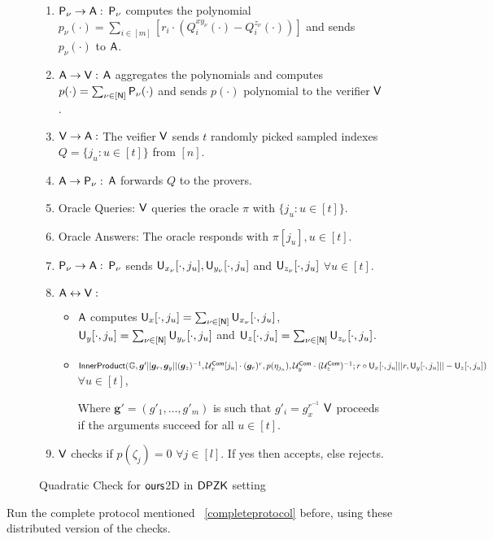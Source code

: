 \begin{figure}[h!]
\begin{framed}
\begin{enumerate}
			\item $\mathsf{P}_{\nu} \rightarrow \mathsf{A} : $ $\mathsf{P}_{\nu}$ computes the polynomial $p_{\nu}(\cdot) = \sum_{i\in [m]} [r_i \cdot (Q^{{xy}_{\nu}}_i(\cdot)  - Q^{z_{\nu}}_i(\cdot))]$ and sends $p_{\nu}(\cdot)$ to $\mathsf{A}$.
	
			\item $\mathsf{A} \rightarrow \mathsf{V} : $ $\mathsf{A}$ aggregates the polynomials and computes $p(\cdot) = \sum_{\nu \in [\mathsf{N}]} \mathsf{P}_{\nu}(\cdot)$ and sends $p(\cdot)$ polynomial to the verifier $\mathsf{V}$.
			
			\item $\mathsf{V} \rightarrow \mathsf{A} : $ The veifier $\mathsf{V}$ sends $t$ randomly picked sampled indexes $Q= \{j_u: u\in[t]\}$ from $[n]$. 
			
			\item $\mathsf{A} \rightarrow \mathsf{P}_{\nu} : $ $\mathsf{A}$ forwards $Q$ to the provers.
			
			\item Oracle Queries: $\mathsf{V}$ queries the oracle $\pi$ with $\{j_u:u\in[t]\}$.
			
			\item Oracle Answers: The oracle responds with $\pi[j_u], u\in[t]$.
	
			\item $\mathsf{P}_{\nu} \rightarrow \mathsf{A} : $ $\mathsf{P}_{\nu}$ sends $\mathsf{U}_{x_{\nu}}[\cdot, j_u], \mathsf{U}_{y_{\nu}}[\cdot, j_u]$ and $\mathsf{U}_{z_{\nu}}[\cdot,j_u]$ $\forall u\in[t]$.
	
			\item $\mathsf{A} \leftrightarrow \mathsf{V} : $ 
			\begin{itemize} 
				\item $\mathsf{A}$ computes $\mathsf{U}_{x}[\cdot, j_u] = \sum_{\nu \in [\mathsf{N}]} \mathsf{U}_{x_{\nu}}[\cdot, j_u]$, $\mathsf{U}_{y}[\cdot, j_u] = \sum_{\nu \in [\mathsf{N}]} \mathsf{U}_{y_{\nu}}[\cdot, j_u]$ and $\mathsf{U}_{z}[\cdot, j_u] = \sum_{\nu \in [\mathsf{N}]} \mathsf{U}_{z_{\nu}}[\cdot, j_u]$.
				
				\item $\mathsf{InnerProduct}(\mathbb{G},\bm{g}'||\bm{g}_r, \bm{g}_y||(\bm{g}_z)^{-1}, \mathcal{U}^{\mathsf{Com}}_x[j_u]\cdot (\bm{g}_r)^r, p(\eta_{j_u}), \mathcal{U}^{\mathsf{Com}}_y\cdot (\mathcal{U}^{\mathsf{Com}}_z)^{-1}; r\circ\mathsf{U}_x[\cdot,j_u]||r, \mathsf{U}_y[\cdot,j_u]||-\mathsf{U}_z[\cdot,j_u])$ $\forall u\in [t]$,
				
				Where $\bm{g}'= (g'_1, \ldots, g'_m)$ is such that $g'_i = g_x^{r^{-1}}$ 
				$\mathsf{V}$ proceeds if the arguments succeed for all $u \in [t]$.
			\end{itemize} 
	
			\item $\mathsf{V}$ checks if $p(\zeta_j) = 0$ $\forall j \in [l]$. If yes then accepts, else rejects.
		\end{enumerate}
	\end{framed}
	\caption{Quadratic Check for $\textsf{ours}$2D in $\mathsf{DPZK}$ setting}
\end{figure}
Run the complete protocol mentioned ~\ref{completeprotocol} before, using these distributed version of the checks.

